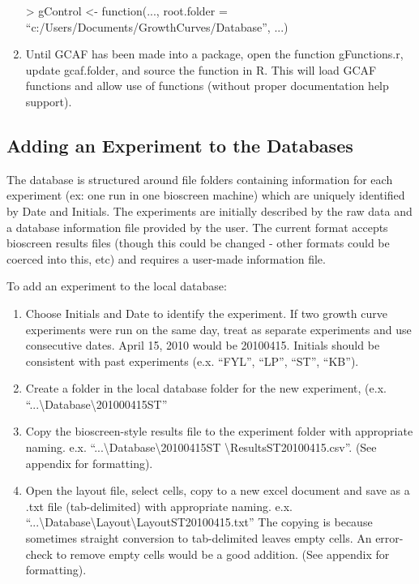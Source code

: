 \documentclass[11pt]{article}
\newenvironment{example}
{\ttfamily \footnotesize >}
{\normalsize \rmfamily}
\newcommand{\inlex}[1]{\ttfamily\small{#1}\rmfamily}
\begin{document}
\begin{spacing}{.1}
\begin{enumerate}
\begin{example}
gControl <- function(..., root.folder = ``c:/Users/Documents/GrowthCurves/Database'', ...)
\end{example}

\item Until GCAF has been made into a package, open the function \inlex{gFunctions.r}, update \inlex{gcaf.folder}, and source the function in R. This will load GCAF functions and allow use of functions (without proper documentation help support).
\end{enumerate}


\subsection{Adding an Experiment to the Databases}
The database is structured around file folders containing information for each experiment (ex: one run in one bioscreen machine) which are uniquely identified by \inlex{Date} and \inlex{Initials}. The experiments are initially described by the raw data and a database information file provided by the user. The current format accepts bioscreen results files (though this could be changed - other formats could be coerced into this, etc) and requires a user-made information file.

To add an experiment to the local database:

\begin{enumerate}
\item Choose \inlex{Initials} and \inlex{Date} to identify the experiment. If two growth curve experiments were run on the same day, treat as separate experiments and use consecutive dates. April 15, 2010 would be \inlex{20100415}. Initials should be consistent with past experiments (e.x. \inlex{``FYL'', ``LP'', ``ST'', ``KB''}).

\item Create a folder in the local database folder for the new experiment, (e.x. \inlex{``...\textbackslash Database\textbackslash201000415ST''}

\item Copy the bioscreen-style results file to the experiment folder with appropriate naming. e.x. \inlex{``...\textbackslash Database\textbackslash 20100415ST \textbackslash ResultsST20100415.csv''}. (See appendix for formatting).

\item Open the layout file, select cells, copy to a new excel document and save as a .txt file (tab-delimited) with appropriate naming. e.x. \inlex{``...\textbackslash Database\textbackslash Layout\textbackslash LayoutST20100415.txt''} \footnotesize{The copying is because sometimes straight conversion to tab-delimited leaves empty cells. An error-check to remove empty cells would be a good addition.} (See appendix for formatting).


\end{enumerate}
\end{spacing}
\end{document}
